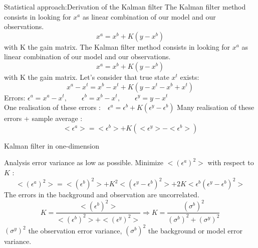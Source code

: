    \begin{frame}[allowframebreaks]{Statistical approach:Derivation of the Kalman filter}
       The Kalman filter method consists in looking for $x^a$ as linear combination of our model and our observations.
       \begin{equation}
           x^a=x^b+K(y-x^b)
           \label{eq1}
       \end{equation}
       with K the gain matrix.
    \newpage
        The Kalman filter method consists in looking for $x^a$ as linear combination of our model and our observations.
       \begin{equation}
           x^a=x^b+K(y-x^b)
           \label{eq1}
       \end{equation}
       with K the gain matrix.
       \newline Let’s consider that true state $x^t$ exists:
       \begin{equation}
           x^a-x^t=x^b-x^t+K(y-x^t-x^b+x^t)
       \end{equation}
       Errors: \qquad $\epsilon^a=x^a-x^t,\qquad \epsilon^b=x^b-x^t, \qquad \epsilon^y=y-x^t$ \\
       One realisation of these errors :$ \quad \epsilon^a=\epsilon^b+K(\epsilon^y-\epsilon^b)$
       Many realisation of these errors + sample average :
       \begin{equation}
           <\epsilon^a>=<\epsilon^b>+K(<\epsilon^y>-<\epsilon^b>)
       \end{equation}
    \end{frame}
    \begin{frame}{Kalman filter in one-dimension}

       Analysis error variance as low as possible.
       \newline Minimize $<(\epsilon^a)^2>$ with respect to $K$ :
       $$<(\epsilon^a)^2>=<(\epsilon^b)^2>+K^2<(\epsilon^y-\epsilon^b)^2>+2K<\epsilon^b(\epsilon^y-\epsilon^b)^2>$$
       The errors in the background and observation are uncorrelated.
       $$K=\frac{<(\epsilon^b)^2>}{<(\epsilon^b)^2>+<(\epsilon^y)^2>} \Rightarrow K=\frac{(\sigma^b)^2}{(\sigma^b)^2+(\sigma^y)^2} $$
       $(\sigma^y)^2$ the observation error variance, \newline $(\sigma^b)^2$ the background or model error variance.
   
	\end{frame}
       
